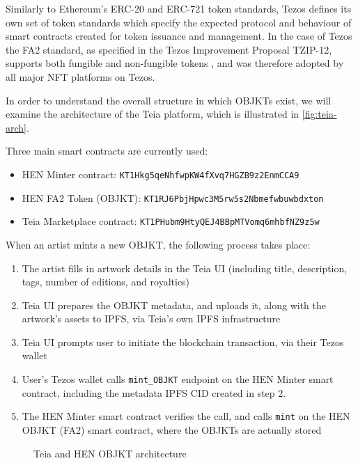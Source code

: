 Similarly to Ethereum's ERC-20 and ERC-721 token standards, Tezos defines its own set of token standards which specify the expected protocol and behaviour of smart contracts created for token issuance and management. In the case of Tezos the FA2 standard, as specified in the Tezos Improvement Proposal TZIP-12, supports both fungible and non-fungible tokens \cite{mishuraTZIP12FA2MultiAsset2020} \cite{opentezosTokenStandardsOpenTezos2024}, and was therefore adopted by all major NFT platforms on Tezos.

In order to understand the overall structure in which OBJKTs exist, we will examine the architecture of the Teia platform, which is illustrated in \autoref{fig:teia-arch}.

Three main smart contracts are currently used:

\begin{itemize}
    \item HEN Minter contract: \texttt{KT1Hkg5qeNhfwpKW4fXvq7HGZB9z2EnmCCA9} 
    \item HEN FA2 Token (OBJKT): \texttt{KT1RJ6PbjHpwc3M5rw5s2Nbmefwbuwbdxton}
    \item Teia Marketplace contract: \texttt{KT1PHubm9HtyQEJ4BBpMTVomq6mhbfNZ9z5w}
\end{itemize}

When an artist mints a new OBJKT, the following process takes place:

\begin{enumerate}
    \item The artist fills in artwork details in the Teia UI (including title, description, tags, number of editions, and royalties)
    \item Teia UI prepares the OBJKT metadata, and uploads it, along with the artwork's assets to IPFS, via Teia's own IPFS infrastructure
    \item Teia UI prompts user to initiate the blockchain transaction, via their Tezos wallet
    \item User's Tezos wallet calls \texttt{mint\_OBJKT} endpoint on the HEN Minter smart contract, including the metadata IPFS CID created in step 2.
    \item The HEN Minter smart contract verifies the call, and calls \texttt{mint} on the HEN OBJKT (FA2) smart contract, where the OBJKTs are actually stored
\end{enumerate}

\begin{figure}[H]
    \centering
    \captionsetup{justification=centering}
    
    \caption[Teia and HEN OBJKT architecture]{Teia and HEN OBJKT architecture}
    \label{fig:teia-arch}
\end{figure}

